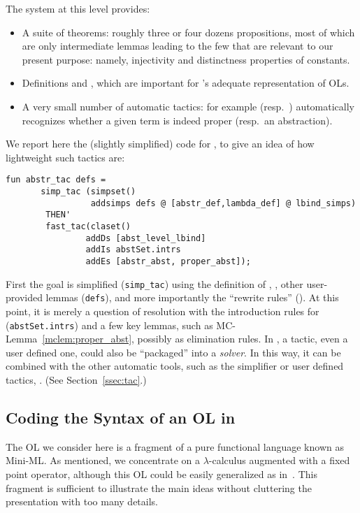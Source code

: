 \documentclass[final]{svjour3}
\begin{document}
The system at this level provides:
\begin{itemize}
\item A suite of theorems: roughly three or four dozens propositions,
  most of which are only intermediate lemmas leading to the few that are
  relevant to our present purpose: namely, injectivity and
  distinctness properties of \hybrid constants.

\item Definitions  and , which are important for
\hybrid's adequate representation of OLs.

\item A very small number of automatic tactics: for example 
  (resp.\ ) automatically recognizes whether a given
  term is indeed proper (resp.~an abstraction).

\end{itemize}

We report here the (slightly simplified) code for ,
to give an idea of how lightweight such tactics are:

\begin{verbatim}
fun abstr_tac defs =
       simp_tac (simpset()
                 addsimps defs @ [abstr_def,lambda_def] @ lbind_simps)
        THEN'
        fast_tac(claset()
                addDs [abst_level_lbind]
                addIs abstSet.intrs
                addEs [abstr_abst, proper_abst]);
\end{verbatim}
First
the goal is simplified (\texttt{simp\_tac}) using the definition of
, , other user-provided lemmas (\texttt{defs}),
and more importantly the  ``rewrite rules''
(). At this point, it is merely a question of
resolution with the introduction rules for 
(\texttt{abstSet.intrs}) and a few key lemmas, such as
MC-Lemma~\ref{mclem:proper_abst}, possibly as elimination rules. In
, a tactic, even a user 
defined one, could also be ``packaged'' into a \emph{solver}. In this
way, it can be combined with the other automatic tools, such as the
simplifier or user defined tactics, \viz  {}.  (See
Section~\ref{ssec:tac}.)


\subsection{Coding the Syntax of an OL in \hybrid}
\label{ssec:coding}

The OL we consider here is a fragment of
a pure functional language known as Mini-ML\@.  As mentioned, we
concentrate on a $\lambda$-calculus augmented with a fixed point operator,
although this OL could be easily generalized as in~\cite{Pfenning01book}.
This fragment is sufficient to illustrate the main ideas without
cluttering the presentation with too many details.
\end{document}
